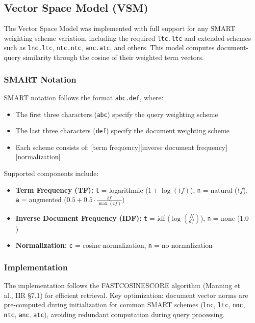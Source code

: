 \documentclass[11pt,a4paper]{article}
\begin{document}
\subsection{Vector Space Model (VSM)}
\label{subsec:vsm}
The Vector Space Model was implemented with full support for any SMART weighting scheme variation, 
including the required \texttt{ltc.ltc} and extended schemes such as \texttt{lnc.ltc}, \texttt{ntc.ntc}, 
\texttt{anc.atc}, and others. 
This model computes document-query similarity through the cosine of their weighted term vectors.

\subsubsection{SMART Notation}
SMART notation follows the format \texttt{abc.def}, where:
\begin{itemize}
    \item The first three characters (\texttt{abc}) specify the query weighting scheme
    \item The last three characters (\texttt{def}) specify the document weighting scheme
    \item Each scheme consists of: [term frequency][inverse document frequency][normalization]
\end{itemize}

Supported components include:
\begin{itemize}
    \item \textbf{Term Frequency (TF):} 
        \texttt{l} = logarithmic ($1 + \log(tf)$), 
        \texttt{n} = natural ($tf$), 
        \texttt{a} = augmented ($0.5 + 0.5 \cdot \frac{tf}{\max(tf)}$)
    \item \textbf{Inverse Document Frequency (IDF):} 
        \texttt{t} = idf ($\log(\frac{N}{df})$), 
        \texttt{n} = none ($1.0$)
    \item \textbf{Normalization:} 
        \texttt{c} = cosine normalization, 
        \texttt{n} = no normalization
\end{itemize}
\newpage
\subsubsection{Implementation}
The implementation follows the FASTCOSINESCORE algorithm (Manning et al., IIR §7.1) 
for efficient retrieval. Key optimization: document vector norms are pre-computed during 
initialization for common SMART schemes (\texttt{lnc}, \texttt{ltc}, \texttt{nnc}, \texttt{ntc}, 
\texttt{anc}, \texttt{atc}), avoiding redundant computation during query processing.
\end{document}
